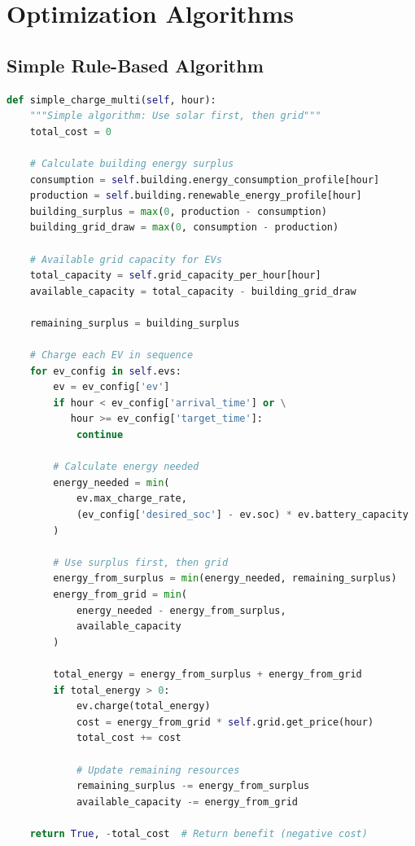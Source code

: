 \section{Optimization Algorithms}
\label{app:algorithms}

\subsection{Simple Rule-Based Algorithm}

\begin{lstlisting}[language=Python,caption={Simple charging algorithm}]
def simple_charge_multi(self, hour):
    """Simple algorithm: Use solar first, then grid"""
    total_cost = 0
    
    # Calculate building energy surplus
    consumption = self.building.energy_consumption_profile[hour]
    production = self.building.renewable_energy_profile[hour]
    building_surplus = max(0, production - consumption)
    building_grid_draw = max(0, consumption - production)
    
    # Available grid capacity for EVs
    total_capacity = self.grid_capacity_per_hour[hour]
    available_capacity = total_capacity - building_grid_draw
    
    remaining_surplus = building_surplus
    
    # Charge each EV in sequence
    for ev_config in self.evs:
        ev = ev_config['ev']
        if hour < ev_config['arrival_time'] or \
           hour >= ev_config['target_time']:
            continue
        
        # Calculate energy needed
        energy_needed = min(
            ev.max_charge_rate,
            (ev_config['desired_soc'] - ev.soc) * ev.battery_capacity
        )
        
        # Use surplus first, then grid
        energy_from_surplus = min(energy_needed, remaining_surplus)
        energy_from_grid = min(
            energy_needed - energy_from_surplus,
            available_capacity
        )
        
        total_energy = energy_from_surplus + energy_from_grid
        if total_energy > 0:
            ev.charge(total_energy)
            cost = energy_from_grid * self.grid.get_price(hour)
            total_cost += cost
            
            # Update remaining resources
            remaining_surplus -= energy_from_surplus
            available_capacity -= energy_from_grid
    
    return True, -total_cost  # Return benefit (negative cost)
\end{lstlisting}

